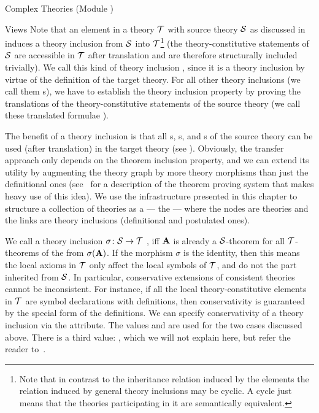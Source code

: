 \begin{tchapter}[id=complex-theories,short=Complex Theories]{Complex Theories (Module
    )}
\begin{tsection}[id=views]{Views}
  Note that an  element in a theory ${\cal T}$ with source theory ${\cal S}$ as
  discussed in  induces a theory inclusion from ${\cal S}$ into
  ${\cal T}$\footnote{Note that in contrast to the inheritance relation induced by the
     elements the relation induced by general theory inclusions may be
    cyclic. A cycle just means that the theories participating in it are semantically
    equivalent.} (the theory-constitutive statements of ${\cal S}$ are accessible in ${\cal T}$
  after translation and are therefore structurally included trivially).  We call this kind
  of theory inclusion , since
  it is a theory inclusion by virtue of the definition of the target theory.  For all
  other theory inclusions (we call them {s}), we
  have to establish the theory inclusion property by proving the translations of the
  theory-constitutive statements of the source theory (we call these translated formulae
  ).

  The benefit of a theory inclusion is that all {s},
  s, and s of the source theory can be used
  (after translation) in the target theory (see ).
  Obviously, the transfer approach only depends on the theorem inclusion property, and we
  can extend its utility by augmenting the theory graph by more theory morphisms than just
  the definitional ones (see~\cite{FaGu93} for a description of the {\imps} theorem
  proving system that makes heavy use of this idea).  We use the infrastructure presented
  in this chapter to structure a collection of theories as a  --- the
   --- where the nodes are theories and the links are theory
  inclusions (definitional and postulated ones).

  We call a theory inclusion $\sigma\colon{\cal S}\to{\cal T}$ , iff ${\bf A}$ is
  already a ${\cal S}$-theorem for all ${\cal T}$-theorems of the from $\sigma({\bf A})$. If the
  morphism $\sigma$ is the identity, then this means the local axioms in ${\cal T}$ only affect
  the local symbols of ${\cal T}$, and do not the part inherited from ${\cal S}$. In particular,
  conservative extensions of consistent theories cannot be inconsistent. For instance, if
  all the local theory-constitutive elements in ${\cal T}$ are symbol declarations with
  definitions, then conservativity is guaranteed by the special form of the
  definitions. We can specify conservativity of a theory inclusion via the
   attribute. The values
   and
   are used for the two cases discussed
  above. There is a third value: , which we
  will not explain here, but refer the reader to~\cite{MAH-06-a}.


\end{tsection}
\end{tchapter}

